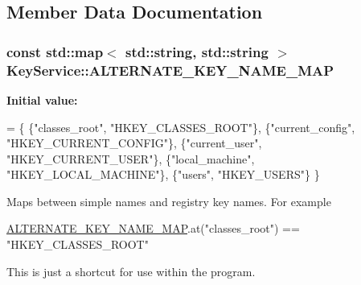 \subsection{Member Data Documentation}
\hypertarget{class_key_service_a142ce8aec67304045a1151e6ac8429a1}{}
\subsubsection[{A\+L\+T\+E\+R\+N\+A\+T\+E\+\_\+\+K\+E\+Y\+\_\+\+N\+A\+M\+E\+\_\+\+M\+A\+P}]{\setlength{\rightskip}{0pt plus 5cm}const std\+::map$<$ std\+::string, std\+::string $>$ Key\+Service\+::\+A\+L\+T\+E\+R\+N\+A\+T\+E\+\_\+\+K\+E\+Y\+\_\+\+N\+A\+M\+E\+\_\+\+M\+A\+P\hspace{0.3cm}{\ttfamily [static]}}\label{class_key_service_a142ce8aec67304045a1151e6ac8429a1}
{\bfseries Initial value\+:}
\begin{DoxyCode}
= \{
  \{\textcolor{stringliteral}{"classes\_root"}, \textcolor{stringliteral}{"HKEY\_CLASSES\_ROOT"}\},
  \{\textcolor{stringliteral}{"current\_config"}, \textcolor{stringliteral}{"HKEY\_CURRENT\_CONFIG"}\},
  \{\textcolor{stringliteral}{"current\_user"}, \textcolor{stringliteral}{"HKEY\_CURRENT\_USER"}\},
  \{\textcolor{stringliteral}{"local\_machine"}, \textcolor{stringliteral}{"HKEY\_LOCAL\_MACHINE"}\},
  \{\textcolor{stringliteral}{"users"}, \textcolor{stringliteral}{"HKEY\_USERS"}\}
\}
\end{DoxyCode}
Maps between simple names and registry key names. For example


\begin{DoxyCode}
\hyperlink{class_key_service_a142ce8aec67304045a1151e6ac8429a1}{ALTERNATE\_KEY\_NAME\_MAP}.at(\textcolor{stringliteral}{"classes\_root"}) == \textcolor{stringliteral}{"HKEY\_CLASSES\_ROOT"} 
\end{DoxyCode}


This is just a shortcut for use within the program. \hypertarget{class_key_service_a105020a568634a91740816aff99ad318}{}
